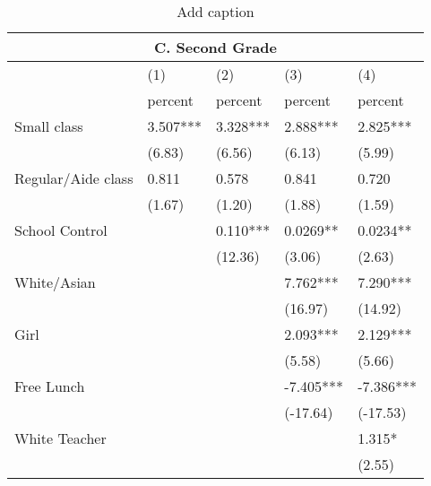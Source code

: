 \documentclass{article}
\begin{document}
{{{{{{{{{{{%
\begin{table}[htbp]
  \centering
  \caption{Add caption}
  \label{tab:sub9}
    \begin{tabular}{lrllrr}
    \toprule
    \multicolumn{6}{c}{C. Second Grade} \\
    \midrule
          &       & (1)   & (2)   & \multicolumn{1}{l}{(3)} & \multicolumn{1}{l}{(4)} \\
          &       & percent & percent & \multicolumn{1}{l}{percent} & \multicolumn{1}{l}{percent} \\
    \multicolumn{2}{l}{Small class} & 3.507*** & 3.328*** & \multicolumn{1}{l}{2.888***} & \multicolumn{1}{l}{2.825***} \\
          &       & (6.83) & (6.56) & \multicolumn{1}{l}{(6.13)} & \multicolumn{1}{l}{(5.99)} \\
    \multicolumn{2}{l}{Regular/Aide class} & 0.811 & 0.578 & \multicolumn{1}{l}{0.841} & \multicolumn{1}{l}{0.720} \\
          &       & (1.67) & (1.20) & \multicolumn{1}{l}{(1.88)} & \multicolumn{1}{l}{(1.59)} \\
    \multicolumn{2}{l}{School Control} &       & 0.110*** & \multicolumn{1}{l}{0.0269**} & \multicolumn{1}{l}{0.0234**} \\
          &       &       & (12.36) & \multicolumn{1}{l}{(3.06)} & \multicolumn{1}{l}{(2.63)} \\
    \multicolumn{2}{l}{White/Asian} &       &       & \multicolumn{1}{l}{7.762***} & \multicolumn{1}{l}{7.290***} \\
          &       &       &       & \multicolumn{1}{l}{(16.97)} & \multicolumn{1}{l}{(14.92)} \\
    \multicolumn{2}{l}{Girl} &       &       & \multicolumn{1}{l}{2.093***} & \multicolumn{1}{l}{2.129***} \\
          &       &       &       & \multicolumn{1}{l}{(5.58)} & \multicolumn{1}{l}{(5.66)} \\
    \multicolumn{2}{l}{Free Lunch} &       &       & \multicolumn{1}{l}{-7.405***} & \multicolumn{1}{l}{-7.386***} \\
          &       &       &       & \multicolumn{1}{l}{(-17.64)} & \multicolumn{1}{l}{(-17.53)} \\
    \multicolumn{2}{l}{White Teacher} &       &       & \multicolumn{1}{l}{} & \multicolumn{1}{l}{1.315*} \\
          &       &       &       & \multicolumn{1}{l}{} & \multicolumn{1}{l}{(2.55)} \\

\end{tabular}
\end{table}}}}}}}}}}}}
\end{document}
